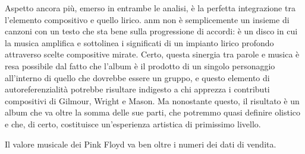 \documentclass[class=book, crop=false, oneside, 12pt]{standalone}
\begin{document}
Aspetto ancora più, emerso in entrambe le analisi,  è la perfetta integrazione tra l'elemento compositivo e quello lirico. \acrlong{anm} non è semplicemente un insieme di canzoni con un testo che sta bene sulla progressione di accordi: è un disco in cui la musica  amplifica e sottolinea i significati di un impianto lirico profondo attraverso scelte compositive mirate. Certo, questa sinergia tra parole e musica è resa possibile dal fatto che l'album è il prodotto di un singolo personaggio all'interno di quello che dovrebbe essere un gruppo, e questo elemento di autoreferenzialità potrebbe risultare indigesto a chi apprezza i contributi compositivi di Gilmour, Wright e Mason. Ma nonostante questo, il risultato è un album che va oltre la somma delle sue parti, che potremmo quasi definire olistico e che, di certo, costituisce un'esperienza artistica di primissimo livello. 

Il valore musicale dei Pink Floyd va ben oltre i numeri dei dati di vendita.
\end{document}
